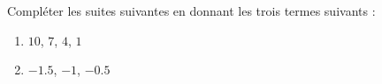
\begin{exercice}\label{exo2smath-0083}

    Compléter les suites suivantes en donnant les trois termes suivants :
    \begin{enumerate}
        \item
            \(10 \), \( 7\), \( 4\), \( 1\)
        \item
            \( -1.5\), \( -1\), \( -0.5\)
    \end{enumerate}

\end{exercice}

